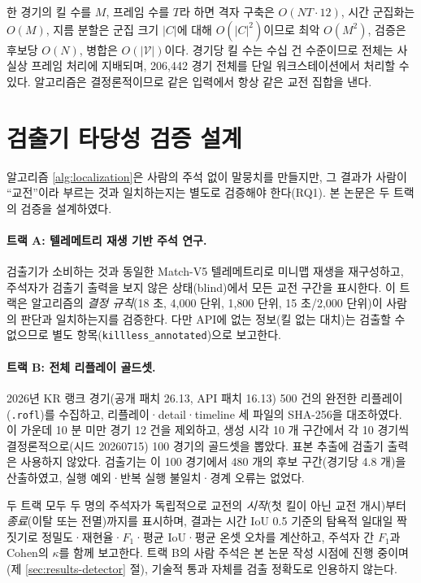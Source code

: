 한 경기의 킬 수를 $M$, 프레임 수를 $T$라 하면 격자 구축은 $O(NT \cdot 12)$, 시간 군집화는 $O(M)$, 지름 분할은 군집 크기 $|C|$에 대해 $O(|C|^2)$이므로 최악 $O(M^2)$, 검증은 후보당 $O(N)$, 병합은 $O(|\mathcal{V}|)$이다. 경기당 킬 수는 수십 건 수준이므로 전체는 사실상 프레임 처리에 지배되며, 206{,}442 경기 전체를 단일 워크스테이션에서 처리할 수 있다. 알고리즘은 결정론적이므로 같은 입력에서 항상 같은 교전 집합을 낸다.

\section{검출기 타당성 검증 설계}
\label{sec:loc-validation}

알고리즘 \ref{alg:localization}은 사람의 주석 없이 말뭉치를 만들지만, 그 결과가 사람이 ``교전''이라 부르는 것과 일치하는지는 별도로 검증해야 한다(RQ1). 본 논문은 두 트랙의 검증을 설계하였다.

\paragraph{트랙 A: 텔레메트리 재생 기반 주석 연구.} 검출기가 소비하는 것과 동일한 Match-V5 텔레메트리로 미니맵 재생을 재구성하고, 주석자가 검출기 출력을 보지 않은 상태(blind)에서 모든 교전 구간을 표시한다. 이 트랙은 알고리즘의 \emph{결정 규칙}(18 초, 4{,}000 단위, 1{,}800 단위, 15 초/2{,}000 단위)이 사람의 판단과 일치하는지를 검증한다. 다만 API에 없는 정보(킬 없는 대치)는 검출할 수 없으므로 별도 항목(\texttt{killless\_annotated})으로 보고한다.

\paragraph{트랙 B: 전체 리플레이 골드셋.} 2026년 KR 랭크 경기(공개 패치 26.13, API 패치 16.13) 500 건의 완전한 리플레이(\texttt{.rofl})를 수집하고, 리플레이·detail·timeline 세 파일의 SHA-256을 대조하였다. 이 가운데 10 분 미만 경기 12 건을 제외하고, 생성 시각 10 개 구간에서 각 10 경기씩 결정론적으로(시드 20260715) 100 경기의 골드셋을 뽑았다. 표본 추출에 검출기 출력은 사용하지 않았다. 검출기는 이 100 경기에서 480 개의 후보 구간(경기당 4.8 개)을 산출하였고, 실행 예외·반복 실행 불일치·경계 오류는 없었다.

두 트랙 모두 두 명의 주석자가 독립적으로 교전의 \emph{시작}(첫 킬이 아닌 교전 개시)부터 \emph{종료}(이탈 또는 전멸)까지를 표시하며, 결과는 시간 IoU 0.5 기준의 탐욕적 일대일 짝짓기로 정밀도·재현율·$F_1$·평균 IoU·평균 온셋 오차를 계산하고, 주석자 간 $F_1$과 Cohen의 $\kappa$를 함께 보고한다. 트랙 B의 사람 주석은 본 논문 작성 시점에 진행 중이며(제 \ref{sec:results-detector} 절), 기술적 통과 자체를 검출 정확도로 인용하지 않는다.
